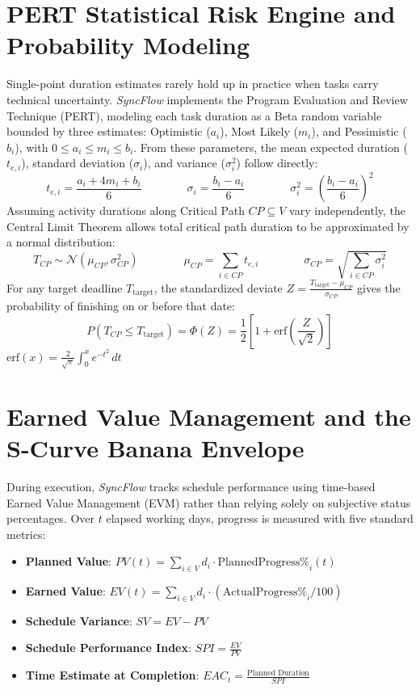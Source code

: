 \vspace{4mm}

\section{PERT Statistical Risk Engine and Probability Modeling}
Single-point duration estimates rarely hold up in practice when tasks carry technical uncertainty. \textit{SyncFlow} implements the Program Evaluation and Review Technique (PERT), modeling each task duration as a Beta random variable bounded by three estimates: Optimistic ($a_i$), Most Likely ($m_i$), and Pessimistic ($b_i$), with $0 \le a_i \le m_i \le b_i$. From these parameters, the mean expected duration ($t_{e,i}$), standard deviation ($\sigma_i$), and variance ($\sigma_i^2$) follow directly:
$$
    t_{e,i} = \frac{a_i + 4m_i + b_i}{6} \qquad \qquad \sigma_i = \frac{b_i - a_i}{6} \qquad \qquad \sigma_i^2 = \left(\frac{b_i - a_i}{6}\right)^2
$$
Assuming activity durations along Critical Path $CP \subseteq V$ vary independently, the Central Limit Theorem allows total critical path duration to be approximated by a normal distribution:
$$
    T_{CP} \sim \mathcal{N}(\mu_{CP}, \sigma_{CP}^2) \qquad \qquad \mu_{CP} = \sum_{i \in CP} t_{e,i} \qquad \qquad \sigma_{CP} = \sqrt{\sum_{i \in CP} \sigma_i^2}
$$
For any target deadline $T_{\text{target}}$, the standardized deviate $Z = \frac{T_{\text{target}} - \mu_{CP}}{\sigma_{CP}}$ gives the probability of finishing on or before that date:
$$
    P(T_{CP} \le T_{\text{target}}) = \Phi(Z) = \frac{1}{2} \left[ 1 + \text{erf}\left(\frac{Z}{\sqrt{2}}\right) \right]
$$
$\text{erf}(x)=\frac{2}{\sqrt{\pi }}\int _{0}^{x}e^{-t^{2}}\,dt$

\newpage

\section{Earned Value Management and the S-Curve Banana Envelope}
During execution, \textit{SyncFlow} tracks schedule performance using time-based Earned Value Management (EVM) rather than relying solely on subjective status percentages. Over $t$ elapsed working days, progress is measured with five standard metrics:
\begin{itemize}[itemsep=1pt,topsep=1pt]
    \item \textbf{Planned Value}: $PV(t) = \sum_{i \in V} d_i \cdot \text{PlannedProgress\%}_i(t)$
    \item \textbf{Earned Value}: $EV(t) = \sum_{i \in V} d_i \cdot (\text{ActualProgress\%}_i / 100)$
    \item \textbf{Schedule Variance}: $SV = EV - PV$
    \item \textbf{Schedule Performance Index}: $SPI = \frac{EV}{PV}$ 
    \item \textbf{Time Estimate at Completion}: $EAC_t = \frac{\text{Planned Duration}}{SPI}$
\end{itemize}

